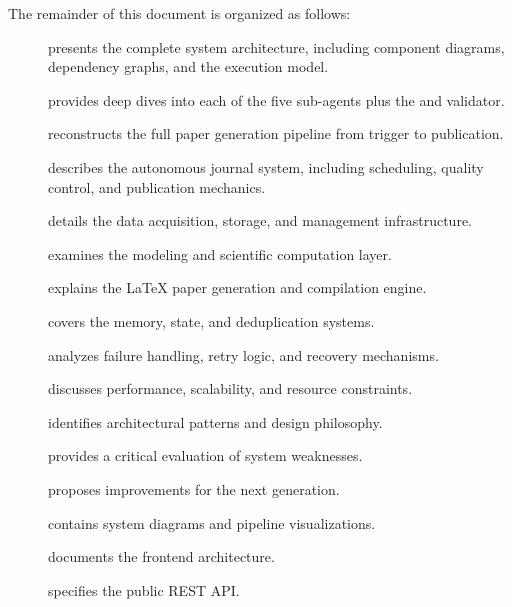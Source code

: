 The remainder of this document is organized as follows:

\begin{description}
  \item[] presents the complete system architecture, including component diagrams, dependency graphs, and the execution model.
  \item[] provides deep dives into each of the five sub-agents plus the \governor and \popper validator.
  \item[] reconstructs the full paper generation pipeline from trigger to publication.
  \item[] describes the autonomous journal system, including scheduling, quality control, and publication mechanics.
  \item[] details the data acquisition, storage, and management infrastructure.
  \item[] examines the modeling and scientific computation layer.
  \item[] explains the \LaTeX{} paper generation and compilation engine.
  \item[] covers the memory, state, and deduplication systems.
  \item[] analyzes failure handling, retry logic, and recovery mechanisms.
  \item[] discusses performance, scalability, and resource constraints.
  \item[] identifies architectural patterns and design philosophy.
  \item[] provides a critical evaluation of system weaknesses.
  \item[] proposes improvements for the next generation.
  \item[] contains system diagrams and pipeline visualizations.
  \item[] documents the frontend architecture.
  \item[] specifies the public REST API.
\end{description}
